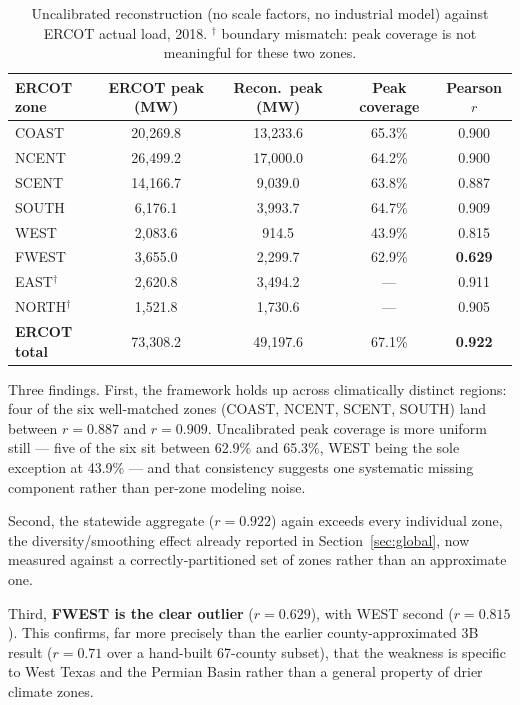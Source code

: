 \documentclass[11pt]{article}
\begin{document}
\begin{table}[H]
\centering
\small
\begin{tabular}{lcccc}
\toprule
ERCOT zone & ERCOT peak (MW) & Recon.\ peak (MW) & Peak coverage & Pearson $r$ \\
\midrule
COAST & 20{,}269.8 & 13{,}233.6 & 65.3\% & 0.900 \\
NCENT & 26{,}499.2 & 17{,}000.0 & 64.2\% & 0.900 \\
SCENT & 14{,}166.7 & 9{,}039.0 & 63.8\% & 0.887 \\
SOUTH & 6{,}176.1 & 3{,}993.7 & 64.7\% & 0.909 \\
WEST & 2{,}083.6 & 914.5 & 43.9\% & 0.815 \\
FWEST & 3{,}655.0 & 2{,}299.7 & 62.9\% & \textbf{0.629} \\
EAST$^\dagger$ & 2{,}620.8 & 3{,}494.2 & --- & 0.911 \\
NORTH$^\dagger$ & 1{,}521.8 & 1{,}730.6 & --- & 0.905 \\
\midrule
\textbf{ERCOT total} & 73{,}308.2 & 49{,}197.6 & 67.1\% & \textbf{0.922} \\
\bottomrule
\end{tabular}
\caption{Uncalibrated reconstruction (no scale factors, no industrial model) against
ERCOT actual load, 2018. $^\dagger$ boundary mismatch: peak coverage is not meaningful
for these two zones.}
\label{tab:ercot8}
\end{table}

Three findings. First, the framework holds up across climatically distinct regions:
four of the six well-matched zones (COAST, NCENT, SCENT, SOUTH) land between $r=0.887$
and $r=0.909$. Uncalibrated peak coverage is more uniform still --- five of the six sit
between 62.9\% and 65.3\%, WEST being the sole exception at 43.9\% --- and that
consistency suggests one systematic missing component rather than per-zone modeling
noise.

Second, the statewide aggregate ($r=0.922$) again exceeds every individual zone, the
diversity/smoothing effect already reported in Section~\ref{sec:global}, now measured
against a correctly-partitioned set of zones rather than an approximate one.

Third, \textbf{FWEST is the clear outlier} ($r=0.629$), with WEST second ($r=0.815$).
This confirms, far more precisely than the earlier county-approximated 3B result
($r=0.71$ over a hand-built 67-county subset), that the weakness is specific to West
Texas and the Permian Basin rather than a general property of drier climate zones.
\end{document}
